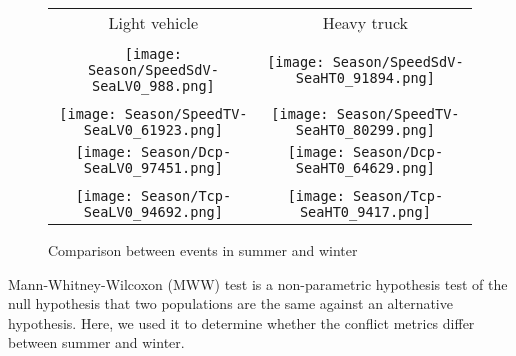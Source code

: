 \documentclass[letterpaper, 10 pt, conference]{ieeeconf}
\begin{document}
\begin{figure}[t]
     \centering
     
     \begin{center}
     \begin{tabular}{  c | c  }
      Light vehicle & Heavy truck\\
      \\
      \label{fig:VSdVSeasonLV}\texttt{[image: Season/SpeedSdV-SeaLV0\_988.png]}
&       \label{fig:VSdVSeasonHT}\texttt{[image: Season/SpeedSdV-SeaHT0\_91894.png]}
 \\ \\
\label{fig:VTVSeasonLV}\texttt{[image: Season/SpeedTV-SeaLV0\_61923.png]}
&
\label{fig:VTVSeasonHT}\texttt{[image: Season/SpeedTV-SeaHT0\_80299.png]}
\\
 \label{fig:DcpSeasonLV}\texttt{[image: Season/Dcp-SeaLV0\_97451.png]}
 &
 \label{fig:DcpSeasonHT}\texttt{[image: Season/Dcp-SeaHT0\_64629.png]}
 \\ \\
\label{fig:TcpSeasonLV}\texttt{[image: Season/Tcp-SeaLV0\_94692.png]}
&
\label{fig:TcpSeasonHT}\texttt{[image: Season/Tcp-SeaHT0\_9417.png]}
\\ 
      \end{tabular}
      \caption{Comparison between events in summer and winter}
      \label{tbl:Season}
      \end{center}
      \end{figure}


Mann-Whitney-Wilcoxon (MWW) test \cite{Mann1947} is a non-parametric hypothesis test of the null hypothesis that two populations are the same against an alternative hypothesis. Here, we used it to determine whether the conflict metrics differ between summer and winter.
\end{document}
